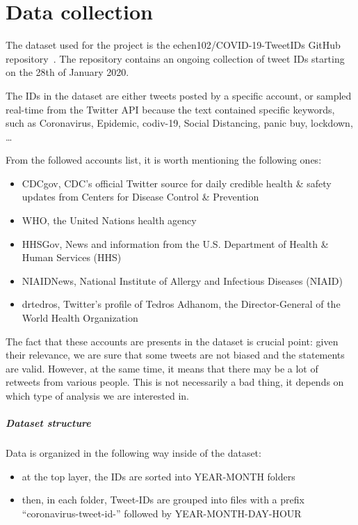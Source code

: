 \graphicspath{{chapters/chapter2/img/}}

\chapter{Data collection}
\label{cha:data}
The dataset used for the project is the echen102/COVID-19-TweetIDs GitHub repository~\cite{chen2020tracking}. The repository contains an ongoing collection of tweet IDs starting on the 28th of January 2020.

The IDs in the dataset are either tweets posted by a specific account, or sampled real-time from the Twitter API because the text contained specific keywords, such as Coronavirus, Epidemic, codiv-19, Social Distancing, panic buy, lockdown, \ldots 

From the followed accounts list, it is worth mentioning the following ones:
\begin{itemize}
	\item CDCgov, CDC's official Twitter source for daily credible health \& safety updates from Centers for Disease Control \& Prevention
	\item WHO, the United Nations health agency
	\item HHSGov, News and information from the U.S. Department of Health \& Human Services (HHS)
	\item NIAIDNews, National Institute of Allergy and Infectious Diseases (NIAID)
	\item drtedros, Twitter's profile of Tedros Adhanom, the Director-General of the World Health Organization
\end{itemize}

The fact that these accounts are presents in the dataset is crucial point: given their relevance, we are sure that some tweets are not biased and the statements are valid. However, at the same time, it means that there may be a lot of retweets from various people. This is not necessarily a bad thing, it depends on which type of analysis we are interested in.

\paragraph{Dataset structure}

Data is organized in the following way inside of the dataset:

\begin{itemize}
	\item at the top layer, the IDs are sorted into YEAR-MONTH folders
	\item then, in each folder, Tweet-IDs are grouped into files with a prefix “coronavirus-tweet-id-” followed by YEAR-MONTH-DAY-HOUR
\end{itemize}


